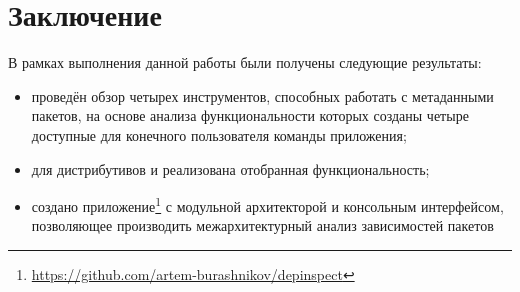 
\section*{Заключение}
В рамках выполнения данной работы были получены следующие результаты:

\begin{itemize}
	\item проведён обзор четырех инструментов, способных работать с метаданными пакетов, на основе анализа функциональности которых созданы четыре доступные для конечного пользователя команды приложения;
	\item для дистрибутивов {\ubuntu} и {\fedora} реализована отобранная функциональность;
	\item создано приложение\footnote{\href{https://github.com/artem-burashnikov/depinspect}{https://github.com/artem-burashnikov/depinspect}} с модульной архитекторой и консольным интерфейсом, позволяющее производить межархитектурный анализ зависимостей пакетов
\end{itemize}
